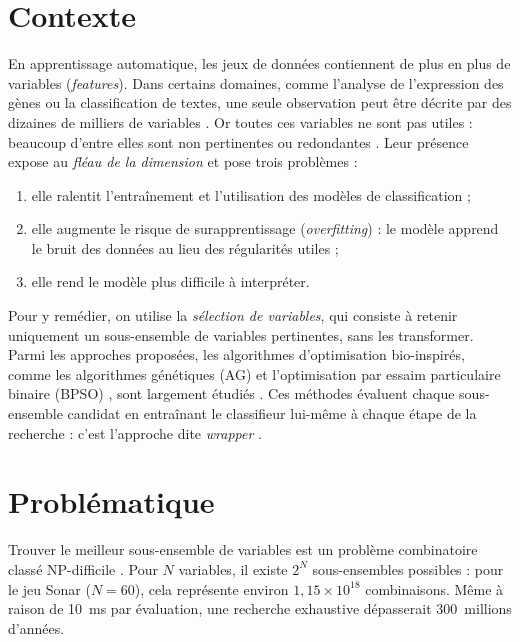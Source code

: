 \documentclass[11pt,a4paper]{report}
\begin{document}
\section*{Contexte}
En apprentissage automatique, les jeux de données contiennent de plus en plus de variables
(\emph{features}). Dans certains domaines, comme l'analyse de l'expression des gènes ou la
classification de textes, une seule observation peut être décrite par des dizaines de milliers de
variables \cite{guyon2003}. Or toutes ces variables ne sont pas utiles : beaucoup d'entre elles
sont non pertinentes ou redondantes \cite{xue2016}. Leur présence expose au \emph{fléau de la
dimension} et pose trois problèmes \cite{guyon2003} :
\begin{enumerate}
  \item elle ralentit l'entraînement et l'utilisation des modèles de classification ;
  \item elle augmente le risque de surapprentissage (\emph{overfitting}) : le modèle apprend le
        bruit des données au lieu des régularités utiles ;
  \item elle rend le modèle plus difficile à interpréter.
\end{enumerate}

Pour y remédier, on utilise la \emph{sélection de variables}, qui consiste à retenir uniquement un
sous-ensemble de variables pertinentes, sans les transformer. Parmi les approches proposées, les
algorithmes d'optimisation bio-inspirés, comme les algorithmes génétiques (AG)
\cite{holland1975,yang1998} et l'optimisation par essaim particulaire binaire (BPSO)
\cite{kennedy1997}, sont largement étudiés \cite{xue2016,agrawal2021,dokeroglu2022}. Ces méthodes
évaluent chaque sous-ensemble candidat en entraînant le classifieur lui-même à chaque étape de la
recherche : c'est l'approche dite \emph{wrapper} \cite{kohavi1997}.

\section*{Problématique}
Trouver le meilleur sous-ensemble de variables est un problème combinatoire classé NP-difficile
\cite{xue2016,dokeroglu2022}. Pour $N$ variables, il existe $2^N$ sous-ensembles possibles
\cite{kohavi1997} : pour le jeu Sonar ($N = 60$), cela représente environ
$1{,}15 \times 10^{18}$ combinaisons. Même à raison de 10~ms par évaluation, une recherche
exhaustive dépasserait 300~millions d'années.
\end{document}
